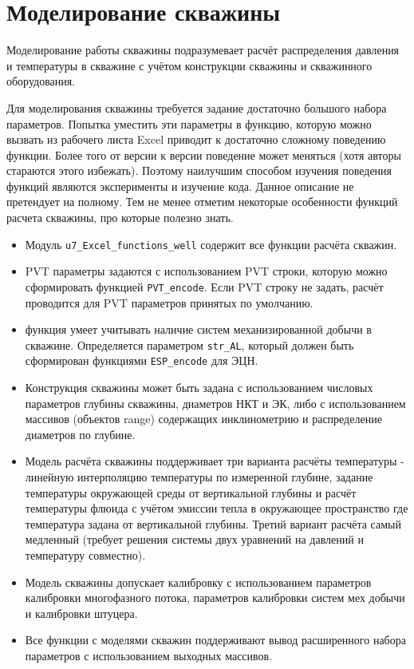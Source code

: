 \section{Моделирование скважины}
Моделирование работы скважины подразумевает расчёт распределения давления и температуры в скважине с учётом конструкции скважины и скважинного оборудования. 

Для моделирования скважины требуется задание достаточно большого набора параметров. Попытка уместить эти параметры в функцию, которую можно вызвать из рабочего листа Excel приводит к достаточно сложному поведению функции. Более того от версии к версии поведение может меняться (хотя авторы стараются этого избежать). Поэтому наилучшим способом изучения поведения функций являются эксперименты и изучение кода. Данное описание не претендует на полному. Тем не менее отметим некоторые особенности функций расчета скважины, про которые полезно знать.

\begin{itemize}
	\item Модуль  \texttt{u7_Excel_functions_well} содержит все функции расчёта скважин.
	\item PVT параметры задаются с использованием PVT строки, которую можно сформировать функцией \texttt{PVT_encode}. Если PVT строку не задать, расчёт проводится для PVT параметров принятых по умолчанию. 
	\item функция умеет учитывать наличие систем механизированной добычи в скважине. Определяется параметром  \texttt{str_AL}, который должен быть сформирован функциями \texttt{ESP_encode} для ЭЦН. %
	\item  Конструкция скважины может быть задана с использованием числовых параметров глубины скважины, диаметров НКТ и ЭК, либо с использованием массивов (объектов range) содержащих инклинометрию и распределение диаметров по глубине. 
	\item  Модель расчёта скважины поддерживает три варианта расчёты температуры - линейную интерполяцию температуры по измеренной глубине, задание температуры окружающей среды от вертикальной глубины и расчёт температуры флюида с учётом эмиссии тепла в окружающее пространство где температура задана от вертикальной глубины. Третий вариант расчёта самый медленный (требует решения системы двух уравнений на давлений и температуру совместно).
	\item  Модель скважины допускает калибровку с использованием параметров калибровки многофазного потока, параметров калибровки систем мех добычи и калибровки штуцера.
	\item  Все функции с моделями скважин поддерживают вывод расширенного набора параметров с использованием выходных массивов.
\end{itemize}


